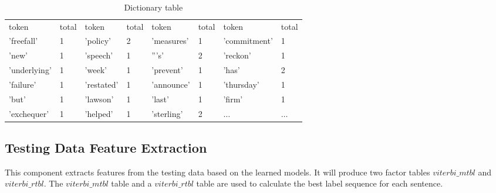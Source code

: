 \begin {table}[h]
\caption {Dictionary table} \label{tab:title}
\begin{center}
    \scriptsize\tt
    \begin{tabular}{ | l | l || l | l || l | l || l | l | }
    \hline
    token     & total & token   & total & token     & total & token       & total\\
    'freefall'& 1     & 'policy'& 2     & 'measures'&1      & 'commitment'&1\\
    'new'&1& 'speech'&1& '''s'&2& 'reckon'&1\\
    'underlying'&1&'week'&1& 'prevent'&1& 'has'&2\\
    'failure'&1& 'restated'&1&'announce'&1& 'thursday'&1\\
    'but'&1& 'lawson'&1& 'last'&1& 'firm'&1\\
    'exchequer'&1& 'helped'&1& 'sterling'&2& $\ldots$ & $\ldots$\\
    \hline
    \end{tabular}
\end{center}
\end {table}


\subsection{Testing Data Feature Extraction}
  This component extracts features from the testing data based on the learned models.
  It will produce two factor tables
  $viterbi\_mtbl$ and  $viterbi\_rtbl$. The $viterbi\_mtbl$
  table and a $viterbi\_rtbl$ table are used to calculate the best label
  sequence for each sentence.

